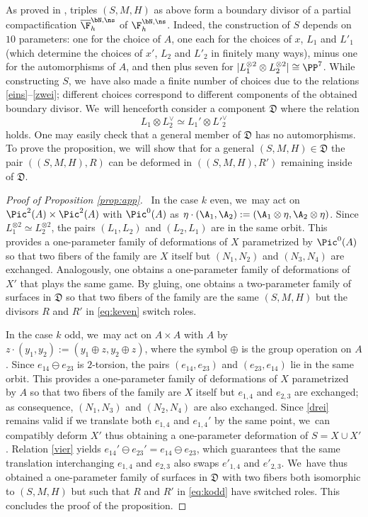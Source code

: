 As proved in \cite[Cor.\,5.9 \& Prop.\,5.4]{KLV1},
triples $(S,M,H)$ as above form a boundary divisor of a partial compactification $\overline{\F}_h^{\bN,\ns}$ of $\F_h^{\bN,\ns}$. Indeed, the construction of $S$
depends on $10$ parameters: one for the choice of $A$, one each for the choices of $x$, $L_1$ and $L'_1$ (which determine the choices of $x'$, $L_2$ and $L'_2$ in finitely many ways), minus one for the automorphisms of $A$, and then plus seven for $|L_1^{\otimes2}\otimes L_2^{\otimes 2}| \cong \PP^7$. While constructing $S$, we~have also made a finite number of choices due to the relations \eqref{eins}--\eqref{zwei}; different choices correspond to different components of the obtained boundary divisor. We~will henceforth consider a component $\mathfrak D$ where the relation
\begin{equation}\label{vier}
L_1\otimes L_2^\vee\simeq L_1'\otimes {L'}_2^\vee
\end{equation}
holds. One may easily check that a general member of $\mathfrak D$ has no automorphisms. To prove the proposition, we~will show that for a general $(S,M,H) \in \mathfrak D$ the pair $((S,M,H),R)$ can be deformed in $((S,M,H),R')$ remaining inside of $\mathfrak D$.

\begin{proof}[Proof of Proposition \ref{prop:app}]\
In the case $k$ even, we~may act on $\Pic^2(A)\times \Pic^2(A)$ with $\Pic^0(A)$ as $\eta\cdot (\A_1,\A_2):=(\A_1\otimes \eta, \A_2\otimes \eta)$. Since $L_1^{\otimes 2}\simeq L_2^{\otimes 2}$, the pairs $(L_1,L_2)$ and $(L_2,L_1)$ are in the same orbit. This provides a one-parameter family of deformations of $X$ parametrized by $\Pic^0(A)$ so that two fibers of the family are $X$ itself but $(N_1,N_2)$ and $(N_3,N_4)$ are exchanged. Analogously, one obtains a one-parameter family of deformations of $X'$ that plays the same game. By gluing, one obtains a two-parameter family of surfaces in $\mathfrak D$ so that two fibers of the family are the same $(S,M,H)$ but the divisors $R$ and $R'$ in \eqref{eq:keven} switch roles.

In the case $k$ odd, we~may act on $A\times A$ with $A$ by $z\cdot (y_1,y_2):=(y_1\oplus z,y_2\oplus z)$, where the symbol $\oplus$ is the group operation on $A$. Since $e_{14}\ominus e_{23}$ is $2$-torsion, the pairs $(e_{14}, e_{23})$ and $(e_{23},e_{14})$ lie in the same orbit. This provides a one-parameter family of deformations of $X$ parametrized by $A$ so that two fibers of the family are $X$ itself but $e_{1,4}$ and $e_{2,3}$ are exchanged; as consequence, $(N_1,N_3)$ and $(N_2,N_4)$ are also exchanged. Since \eqref{drei} remains valid if we translate both $e_{1,4}$ and $e_{1,4}'$ by the same point, we~can compatibly deform $X'$ thus obtaining a one-parameter deformation of $S=X\cup X'$. Relation \eqref{vier} yields $e_{14}'\ominus e_{23}'=e_{14}\ominus e_{23}$, which guarantees that the same translation interchanging $e_{1,4}$ and $e_{2,3}$ also swaps $e'_{1,4}$ and $e'_{2,3}$. We~have thus obtained a one-parameter family of surfaces in $\mathfrak D$ with two fibers both isomorphic to $(S,M,H)$ but such that $R$ and $R'$ in \eqref{eq:kodd} have switched roles. This concludes the proof of the proposition.
\end{proof}
